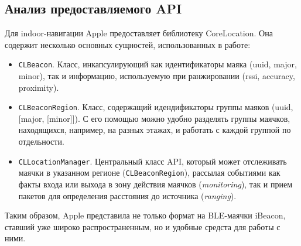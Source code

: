 \subsection{Анализ предоставляемого API}

Для indoor-навигации Apple предоставляет библиотеку CoreLocation. Она содержит несколько основных сущностей, использованных в работе:

\begin{itemize}
    \item
    \texttt{CLBeacon}. Класс, инкапсулирующий как идентификаторы маяка (uuid, major, minor), так и информацию, используемую при ранжировании (rssi, accuracy, proximity).
    \item
    \texttt{CLBeaconRegion}. Класс, содержащий идендификаторы группы маяков (uuid, [major, [minor]]). С его помощью можно удобно разделять группы маячков, находящихся, например, на разных этажах, и работать с каждой группой по отдельности.
    \item
    \texttt{CLLocationManager}. Центральный класс API, который может отслеживать маячки в указанном регионе (\texttt{CLBeaconRegion}), рассылая событиями как факты входа или выхода в зону действия маячков (\textit{mo\-ni\-to\-ring}), так и прием пакетов для определения расстояния до источника (\textit{rang\-ing}).
\end{itemize}

Таким образом, Apple представила не только формат на BLE-маячки iBeacon, ставший уже широко распространенным, но и удобные средста для работы с ними.